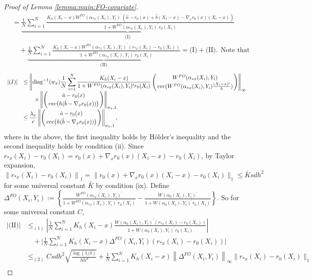 \documentclass[11pt]{article}
\begin{document}
\begin{proof}[Proof of Lemma \ref{lemma:main:FO-covariate}]
$$\begin{array}{rl}
&\displaystyle = \underbrace{\frac{1}{N}\sum_{i=1}^N\frac{K_h(X_i-x)W^{FO}(\alpha_{*x}(X_i),Y_i)^\prime( \hat a - r_0(x) + \hat b(X_i-x) - \nabla_x r_0(x)(X_i-x))}{1+W^{FO}(\alpha_{*x}(X_i),Y_i)^\prime r_0(X_i)}}_{\textrm{(I)}} \\
&\displaystyle\quad + \underbrace{\frac{1}{N}\sum_{i=1}^N\frac{K_h(X_i-x)W^{FO}(\alpha_{*x}(X_i),Y_i)^\prime(r_{*x}(X_i)-r_0(X_i))}{1+W^{FO}(\alpha_{*x}(X_i),Y_i)^\prime r_0(X_i)}}_{\textrm{(II)}} = \textrm{(I)} + \textrm{(II)}.\ \ \mbox{Note that}
\end{array}$$
$$\begin{array}{rl}
|\textrm{(I)}|
&\displaystyle\leq\left\|\mathrm{diag}^{-1}(w_x)\frac{1}{N}\sum_{i=1}^N\frac{  K_h(X_i-x) }{1+W^{FO}(\alpha_{*x}(X_i),Y_i)^\prime r_0(X_i)} \left( { W^{FO}(\alpha_{*x}(X_i),Y_i)}\atop{ {\rm vec}(W^{FO}(\alpha_{*x}(X_i),Y_i)\frac{(X_i-x)'}{h} )}\right)\right\|_\infty\\
&\displaystyle\quad\quad\times\left\|\left( {\hat a - r_0(x)}\atop{ {\rm vec}\big(h(\hat b - \nabla_xr_0(x)})\big)\right) \right\|_{w_x,1}\\
&\displaystyle\leq\frac{\lambda_x}{c}\left\|\left( {\hat a - r_0(x)}\atop{ {\rm vec}\big(h(\hat b - \nabla_xr_0(x)})\big)\right) \right\|_{w_x,1},
\end{array}$$
where in the above, the first inequality holds by H\"older's inequality and the second inequality holds by condition (ii). Since $r_{*x}(X_i)-r_0(X_i)=r_0(x)+\nabla_x r_0(x)(X_i-x) - r_0(X_i)$, by Taylor expansion, $\left\|  r_{*x}(X_i)-r_0(X_i) \right\|_1=\| r_0(x)+\nabla_x r_0(x)(X_i-x) - r_0(X_i) \|_1\leq\bar{K}sdh^2$ for some universal constant $\bar{K}$ by condition (ix). Define $\Delta^{FO}(X_i,Y_i):=\left\{\frac{W^{FO}(\alpha_{*x}(X_i),Y_i)^\prime}{1+W^{FO}(\alpha_{*x}(X_i),Y_i)^\prime r_0(X_i)}-\frac{W(\alpha_0(X_i),Y_i)^\prime}{1+W(\alpha_0(X_i),Y_i)^\prime r_0(X_i)}\right\}$.
So for some universal constant $C$,
$$\begin{array}{rl}
|\textrm{(II)}|&\displaystyle \leq_{(1)} \left|\frac{1}{N}\sum_{i=1}^N K_h(X_i-x)\frac{ W(\alpha_0(X_i),Y_i)^\prime(r_{*x}(X_i)-r_0(X_i))}{1+W(\alpha_0(X_i),Y_i)^\prime r_0(X_i)}\right|\\
&\displaystyle\quad+\bigg|\frac{1}{N}\sum_{i=1}^N K_h(X_i-x)\Delta^{FO}(X_i,Y_i)(r_{*x}(X_i)-r_0(X_i)) \bigg|\\
&\displaystyle\leq_{(2)} Csdh^2\sqrt{\frac{\log(1/\delta)}{Nh^d}}+ \frac{1}{N}{\displaystyle\sum_{i=1}^N} K_h(X_i-x)\left\|\Delta^{FO}(X_i,Y_i)\right\|_\infty\|r_{*x}(X_i)-r_0(X_i)\|_1 \\

\end{array}$$
\end{proof}
\end{document}
